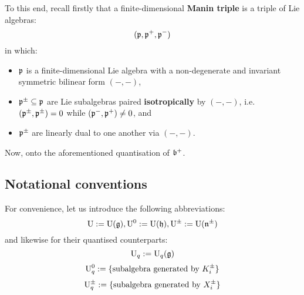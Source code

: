         To this end, recall firstly that a finite-dimensional \textbf{Manin triple} is a triple of Lie algebras:
            $$(\mathfrak{p}, \mathfrak{p}^+, \mathfrak{p}^-)$$
        in which:
        \begin{itemize}
            \item $\mathfrak{p}$ is a finite-dimensional Lie algebra with a non-degenerate and invariant symmetric bilinear form $(-, -)$,
            \item $\mathfrak{p}^{\pm} \subseteq \mathfrak{p}$ are Lie subalgebras paired \textbf{isotropically} by $(-, -)$, i.e. $(\mathfrak{p}^{\pm}, \mathfrak{p}^{\pm}) = 0$ while $(\mathfrak{p}^-, \mathfrak{p}^+) \not = 0$, and
            \item $\mathfrak{p}^{\pm}$ are linearly dual to one another via $(-, -)$.
        \end{itemize}
        

        Now, onto the aforementioned quantisation of $\mathfrak{b}^+$.
        \begin{definition}[$\rmU_q(\b^{\pm})$] \label{def: borel_QUE_subalgebras}
         
        \end{definition}

     \subsection{Notational conventions}
        For convenience, let us introduce the following abbreviations:
            $$\mathrm{U} := \mathrm{U}(\mathfrak{g}), \mathrm{U}^0 := \mathrm{U}(\mathfrak{h}), \mathrm{U}^{\pm} := \mathrm{U}(\mathfrak{n}^{\pm})$$
        and likewise for their quantised counterparts:
            $$\mathrm{U}_q := \mathrm{U}_q(\mathfrak{g})$$
            $$\mathrm{U}_q^0 := \{ \text{subalgebra generated by $K_i^{\pm}$} \}$$
            $$\mathrm{U}_q^{\pm} := \{ \text{subalgebra generated by $X_i^{\pm}$} \}$$